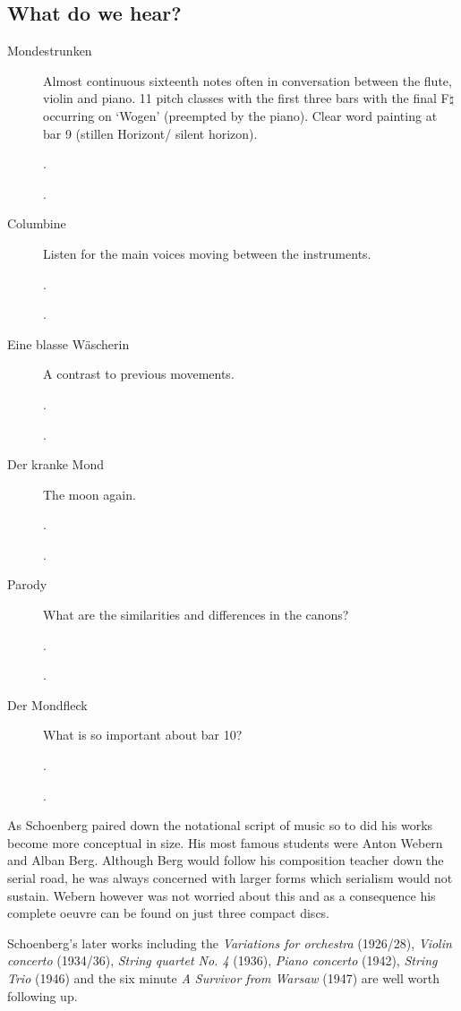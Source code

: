 \newpage
\subsection{What do we hear?}
\begin{description}
\item[Mondestrunken] Almost continuous sixteenth notes often in conversation between the flute, violin and piano. 11 pitch classes with the first three bars with the final F$\natural$ occurring on `Wogen' (preempted by the piano). Clear word painting at bar 9 (stillen Horizont/ silent horizon).

.

.

\item[Columbine] Listen for the main voices moving between the instruments. 

.

.

\item[Eine blasse W\"ascherin] A contrast to previous movements. 

.

.

\item[Der kranke Mond] The moon again. 

.

.

\item[Parody] What are the similarities and differences in the canons?


.

.
\item[Der Mondfleck] What is so important about bar 10?

.

.
 

\end{description}

As Schoenberg paired down the notational script of music so to did his works become more conceptual in size. His most famous students were Anton Webern and Alban Berg. Although Berg would follow his composition teacher down the serial road, he was always concerned with larger forms which serialism would not sustain. Webern however was not worried about this and as a consequence his complete oeuvre can be found on just three compact discs. 

Schoenberg's later works including the \textit{Variations for orchestra} (1926/28), \textit{Violin concerto} (1934/36), \textit{String quartet No. 4} (1936), \textit{Piano concerto} (1942), \textit{String Trio} (1946)
and the six minute \textit{A Survivor from Warsaw} (1947) are well worth following up. 
 


